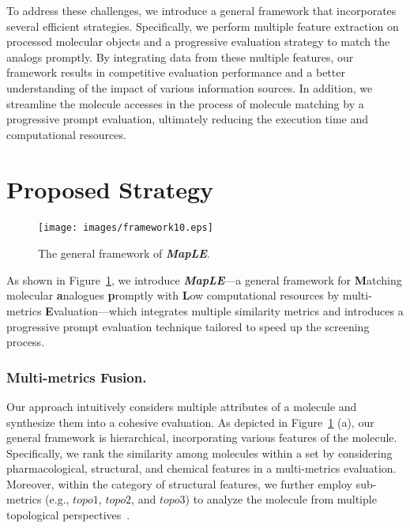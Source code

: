 \documentclass[letterpaper]{article} %
\begin{document}
To address these challenges, we introduce a general framework that incorporates several efficient strategies. Specifically, we perform multiple feature extraction on processed molecular objects and a progressive evaluation strategy to match the analogs promptly. 
By integrating data from these multiple features, our framework results in competitive evaluation performance and a better understanding of the impact of various information sources. 
In addition, we streamline the molecule accesses in the process of molecule matching by a progressive prompt evaluation, ultimately reducing the execution time and computational resources.

\section{Proposed Strategy}

\begin{figure}[htp]
	\centering %
	\texttt{[image: images/framework10.eps]}
	\caption{
		The general framework of \textbf{\textit{MapLE}}. 
	}
	\label{figure:framwork}
\end{figure}

As shown in Figure~\ref{figure:framwork}, we introduce \textbf{\textit{MapLE}}---a general  framework for \textbf{M}atching molecular \textbf{a}nalogues \textbf{p}romptly with \textbf{L}ow
computational resources by multi-metrics \textbf{E}valuation---which integrates multiple similarity metrics and introduces a progressive prompt evaluation technique tailored to speed up the screening process.

\subsubsection{Multi-metrics Fusion.}
Our approach intuitively considers multiple attributes of a molecule and synthesize them into a cohesive evaluation. As depicted in Figure~\ref{figure:framwork} (a), our general framework is hierarchical, incorporating various features of the molecule. Specifically, we rank the similarity among molecules within a set by considering pharmacological, structural, and chemical features in a multi-metrics evaluation. Moreover, within the category of structural features, we further employ sub-metrics (e.g., $topo1$, $topo2$, and $topo3$) to analyze the molecule from multiple topological perspectives~\cite{Kim2023}.
\end{document}
